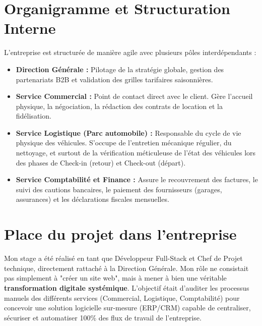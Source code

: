 \section{Organigramme et Structuration Interne}
L'entreprise est structurée de manière agile avec plusieurs pôles interdépendants :
\begin{itemize}
    \item \textbf{Direction Générale :} Pilotage de la stratégie globale, gestion des partenariats B2B et validation des grilles tarifaires saisonnières.
    \item \textbf{Service Commercial :} Point de contact direct avec le client. Gère l'accueil physique, la négociation, la rédaction des contrats de location et la fidélisation.
    \item \textbf{Service Logistique (Parc automobile) :} Responsable du cycle de vie physique des véhicules. S'occupe de l'entretien mécanique régulier, du nettoyage, et surtout de la vérification méticuleuse de l'état des véhicules lors des phases de Check-in (retour) et Check-out (départ).
    \item \textbf{Service Comptabilité et Finance :} Assure le recouvrement des factures, le suivi des cautions bancaires, le paiement des fournisseurs (garages, assurances) et les déclarations fiscales mensuelles.
\end{itemize}

\section{Place du projet dans l'entreprise}
Mon stage a été réalisé en tant que Développeur Full-Stack et Chef de Projet technique, directement rattaché à la Direction Générale. Mon rôle ne consistait pas simplement à "créer un site web", mais à mener à bien une véritable \textbf{transformation digitale systémique}. L'objectif était d'auditer les processus manuels des différents services (Commercial, Logistique, Comptabilité) pour concevoir une solution logicielle sur-mesure (ERP/CRM) capable de centraliser, sécuriser et automatiser 100\% des flux de travail de l'entreprise.
